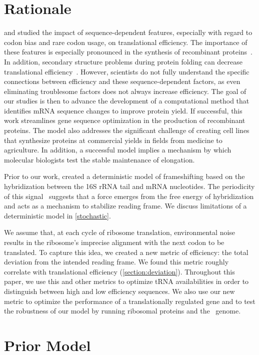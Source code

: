 \documentclass{article}
\begin{document}
\section{Rationale}
\citet{kozak05} and \citet{kane95} studied the impact
of sequence-dependent features, especially with regard to codon bias 
and rare codon usage, on translational efficiency.  The importance of 
these features is especially pronounced in the synthesis of recombinant 
proteins~\cite{sorensen05}.  In addition, secondary structure problems 
during protein folding can decrease translational 
efficiency~\cite{kozak05}.  However, scientists do not fully
understand the specific connections between efficiency and these
sequence-dependent factors, as even eliminating troublesome factors
does not always increase efficiency. The goal of our studies is then to
advance the development of a computational method that identifies mRNA
sequence changes to improve protein yield. If
successful, this work streamlines gene sequence optimization in the
production of recombinant proteins. The model also addresses the
significant challenge of creating cell lines
that synthesize proteins at commercial yields in fields from
medicine to agriculture. In addition, a successful model implies a mechanism by
which molecular biologists test the stable maintenance of
elongation.

Prior to our work, \citet{lalit:jbsb} created a deterministic model of
frameshifting based on the hybridization between the 16S rRNA tail and
mRNA nucleotides.  The periodicity of this
signal~\cite{lalit:jbsb} suggests that a force emerges from the free
energy of hybridization and acts as a mechanism to
stabilize reading frame.  We discuss limitations of a deterministic 
model in \autoref{stochastic}.

We assume that, at each cycle of ribosome translation, environmental
noise results in the ribosome's imprecise alignment
with the next codon to be translated.  To capture this idea, we
created a new metric of efficiency: the total deviation from the
intended reading frame.  We found this metric
roughly correlate with translational
efficiency (\autoref{section:deviation}).  Throughout this paper, we use this and other metrics to
optimize tRNA availabilities in order to distinguish between
high and low efficiency sequences. We also use our new
metric to optimize the performance of a translationally regulated gene
and to test the robustness of our model by running  ribosomal proteins and the
\ecoli\ genome.

\section{Prior Model}
\end{document}
